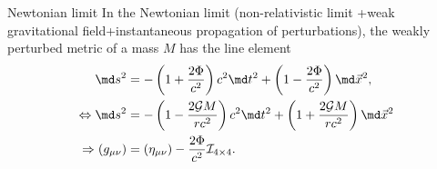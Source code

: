 \begin{mybox}{Newtonian limit}
	In the Newtonian limit (non-relativistic limit +weak gravitational field+instantaneous propagation of perturbations), the weakly perturbed metric of a mass $M$ has the line element
	\begin{align}
		\md s^2 &= - \left(1+ \frac{2 \Phi}{c^2}\right) c^2 \md t^2 + \left(1-\frac{2 \Phi}{c^2}\right) \md \vec{x}^2,\\
		\Leftrightarrow \md s^2 &=-\left(1 - \frac{2 \mathcal{G}M}{r c^2}\right) c^2 \md t^2 + \left(1+\frac{2 \mathcal{G}M}{r c^2}\right) \md \vec{x}^2\\
		\Rightarrow (g_{\mu \nu}) &= (\eta_{\mu \nu}) - \frac{2 \Phi}{c^2} \mathcal{I}_{4\times 4}.
	\end{align}
\end{mybox}

